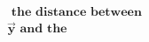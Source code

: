 \documentclass[preview]{standalone}
\begin{document}
\begin{align*}
\,\, \textbf{the distance between} \\ \mathbf{\vec{y}} \,\, \textbf{and the}
\end{align*}
\end{document}
